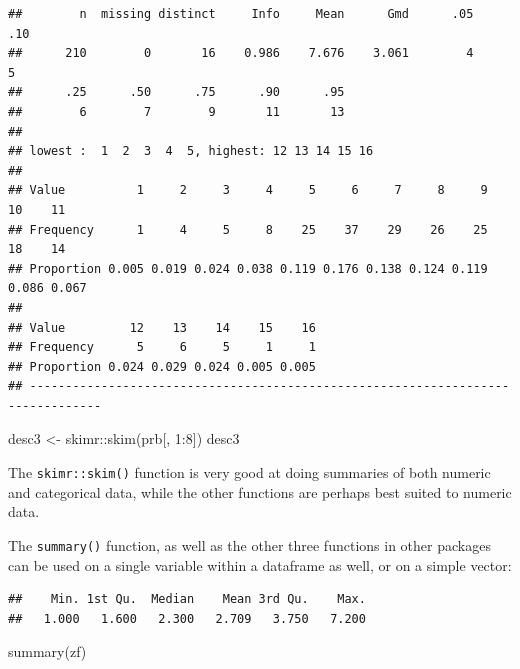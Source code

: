 \documentclass[
]{article}
\newenvironment{Shaded}{\begin{snugshade}}{\end{snugshade}}
\newcommand{\DecValTok}[1]{\textcolor[rgb]{0.00,0.00,0.81}{#1}}
\newcommand{\FunctionTok}[1]{\textcolor[rgb]{0.00,0.00,0.00}{#1}}
\newcommand{\NormalTok}[1]{#1}
\newcommand{\OtherTok}[1]{\textcolor[rgb]{0.56,0.35,0.01}{#1}}
\newcommand{\SpecialCharTok}[1]{\textcolor[rgb]{0.00,0.00,0.00}{#1}}
\begin{document}
\begin{verbatim}
##        n  missing distinct     Info     Mean      Gmd      .05      .10 
##      210        0       16    0.986    7.676    3.061        4        5 
##      .25      .50      .75      .90      .95 
##        6        7        9       11       13 
## 
## lowest :  1  2  3  4  5, highest: 12 13 14 15 16
##                                                                             
## Value          1     2     3     4     5     6     7     8     9    10    11
## Frequency      1     4     5     8    25    37    29    26    25    18    14
## Proportion 0.005 0.019 0.024 0.038 0.119 0.176 0.138 0.124 0.119 0.086 0.067
##                                         
## Value         12    13    14    15    16
## Frequency      5     6     5     1     1
## Proportion 0.024 0.029 0.024 0.005 0.005
## --------------------------------------------------------------------------------
\end{verbatim}

\begin{Shaded}
\begin{Highlighting}[]
\NormalTok{desc3 }\OtherTok{\textless{}{-}}\NormalTok{ skimr}\SpecialCharTok{::}\FunctionTok{skim}\NormalTok{(prb[, }\DecValTok{1}\SpecialCharTok{:}\DecValTok{8}\NormalTok{])}
\NormalTok{desc3}
\end{Highlighting}
\end{Shaded}

The \texttt{skimr::skim()} function is very good at doing summaries of both
numeric and categorical data, while the other functions are perhaps best
suited to numeric data.

The \texttt{summary()} function, as well as the other three functions in other
packages can be used on a single variable within a dataframe as well, or
on a simple vector:

\begin{Shaded}
\end{Shaded}

\begin{verbatim}
##    Min. 1st Qu.  Median    Mean 3rd Qu.    Max. 
##   1.000   1.600   2.300   2.709   3.750   7.200
\end{verbatim}

\begin{Shaded}
\begin{Highlighting}[]
\FunctionTok{summary}\NormalTok{(zf)}
\end{Highlighting}
\end{Shaded}
\end{document}
